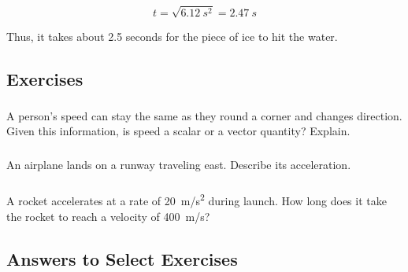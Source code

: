 \documentclass[main-ap-physics.tex]{subfiles}
\begin{document}
\begin{equation*}
    t = \sqrt{\SI{6.12}{s^2}} = \SI{2.47}{s}
\end{equation*}

Thus, it takes about 2.5 seconds for the piece of ice to hit the water.

\endsolution



\clearpage

\subsection{Exercises}

\subsubsection*{} %

\begin{exercise} \label{hJNNqd}
    A person's speed can stay the same as they round a corner and changes direction. Given this information, is speed a scalar or a vector quantity? Explain.
\end{exercise}

\subsubsection*{} %

\begin{exercise} \label{OKpKf5}
    An airplane lands on a runway traveling east. Describe its acceleration.
\end{exercise}

\subsubsection*{} %

\begin{exercise} \label{HbNHjj}
A rocket accelerates at a rate of \SI{20}{m/s^2} during launch. How long does it take the rocket to reach a velocity of \SI{400}{m/s}?
\end{exercise}

\subsection{Answers to Select Exercises}
\end{document}
